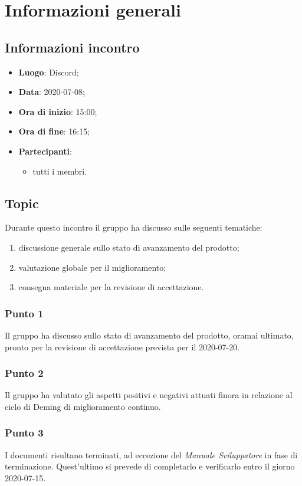 \section{Informazioni generali}
\subsection{Informazioni incontro}
\begin{itemize}
\item \textbf{Luogo}: Discord;
\item \textbf{Data}: 2020-07-08;
\item \textbf{Ora di inizio}: 15:00;
\item \textbf{Ora di fine}: 16:15;
\item \textbf{Partecipanti}:
	\begin{itemize}
		\item tutti i membri.
	\end{itemize}
\end{itemize}

\subsection{Topic}
Durante questo incontro il gruppo ha discusso sulle seguenti tematiche:
\begin{enumerate}
\item discussione generale sullo stato di avanzamento del prodotto;
\item valutazione globale per il miglioramento;
\item consegna materiale per la revisione di accettazione.
\end{enumerate}

\subsubsection{Punto 1}
Il gruppo ha discusso sullo stato di avanzamento del prodotto, oramai ultimato, pronto per la revisione di accettazione prevista per il 2020-07-20.

\subsubsection{Punto 2}
Il gruppo ha valutato gli aspetti positivi e negativi attuati finora in relazione al ciclo di Deming di miglioramento continuo.

\subsubsection{Punto 3}
I documenti risultano terminati, ad eccezione del \textit{Manuale Sviluppatore} in fase di terminazione. Quest'ultimo si prevede di completarlo e verificarlo entro il giorno 2020-07-15.

